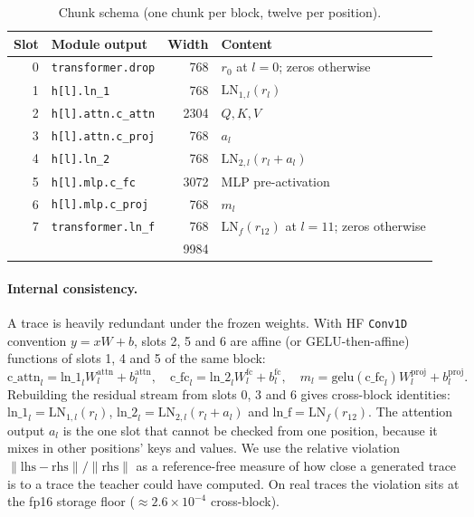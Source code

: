 \documentclass[11pt]{article}
\newcommand{\LN}{\mathrm{LN}}
\begin{document}
\begin{table}[h]
  \centering\small
  \begin{tabular}{@{}rlrl@{}}
    \toprule
    Slot & Module output & Width & Content \\
    \midrule
    0 & \texttt{transformer.drop} & 768 & $r_0$ at $l=0$; zeros otherwise \\
    1 & \texttt{h[l].ln\_1} & 768 & $\LN_{1,l}(r_l)$ \\
    2 & \texttt{h[l].attn.c\_attn} & 2304 & $Q, K, V$ \\
    3 & \texttt{h[l].attn.c\_proj} & 768 & $a_l$ \\
    4 & \texttt{h[l].ln\_2} & 768 & $\LN_{2,l}(r_l + a_l)$ \\
    5 & \texttt{h[l].mlp.c\_fc} & 3072 & MLP pre-activation \\
    6 & \texttt{h[l].mlp.c\_proj} & 768 & $m_l$ \\
    7 & \texttt{transformer.ln\_f} & 768 & $\LN_f(r_{12})$ at $l=11$; zeros otherwise \\
    \midrule
    & & 9984 & \\
    \bottomrule
  \end{tabular}
  \caption{Chunk schema (one chunk per block, twelve per position).}
  \label{tab:schema}
\end{table}

\paragraph{Internal consistency.} A trace is heavily redundant under the frozen weights. With HF \texttt{Conv1D}
convention $y = xW + b$, slots 2, 5 and 6 are affine (or GELU-then-affine) functions of slots 1, 4 and 5 of the same block:
\begin{equation}
  \text{c\_attn}_l = \text{ln\_1}_l W^{\text{attn}}_l + b^{\text{attn}}_l,\quad
  \text{c\_fc}_l = \text{ln\_2}_l W^{\text{fc}}_l + b^{\text{fc}}_l,\quad
  m_l = \mathrm{gelu}(\text{c\_fc}_l) W^{\text{proj}}_l + b^{\text{proj}}_l .
  \label{eq:intra}
\end{equation}
Rebuilding the residual stream from slots 0, 3 and 6 gives cross-block identities:
$\text{ln\_1}_l = \LN_{1,l}(r_l)$, $\text{ln\_2}_l = \LN_{2,l}(r_l + a_l)$ and $\text{ln\_f} = \LN_f(r_{12})$.
The attention output $a_l$ is the one slot that cannot be checked from one position, because it mixes in other positions'
keys and values. We use the relative violation $\lVert \text{lhs} - \text{rhs}\rVert / \lVert\text{rhs}\rVert$ as a
reference-free measure of how close a generated trace is to a trace the teacher could have computed. On real traces the
violation sits at the fp16 storage floor ($\approx 2.6\times10^{-4}$ cross-block).
\end{document}
